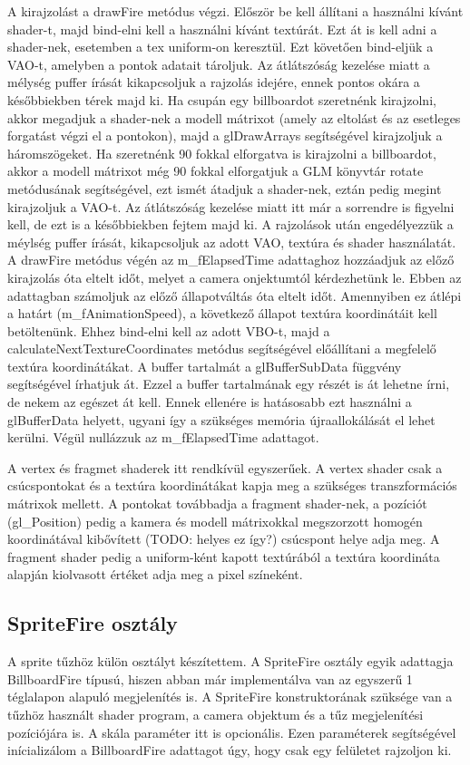 A kirajzolást a drawFire metódus végzi. Először be kell állítani a használni kívánt shader-t, majd bind-elni kell a használni kívánt textúrát. Ezt át is kell adni a shader-nek, esetemben a tex uniform-on keresztül. Ezt követően bind-eljük a VAO-t, amelyben a pontok adatait tároljuk. Az átlátszóság kezelése miatt a mélység puffer írását kikapcsoljuk a rajzolás idejére, ennek pontos okára a későbbiekben térek majd ki. Ha csupán egy billboardot szeretnénk kirajzolni, akkor megadjuk a shader-nek a modell mátrixot (amely az eltolást és az esetleges forgatást végzi el a pontokon), majd a glDrawArrays segítségével kirajzoljuk a háromszögeket. Ha szeretnénk 90 fokkal elforgatva is kirajzolni a billboardot, akkor a modell mátrixot még 90 fokkal elforgatjuk a GLM könyvtár rotate metódusának segítségével, ezt ismét átadjuk a shader-nek, eztán pedig megint kirajzoljuk a VAO-t. Az átlátszóság kezelése miatt itt már a sorrendre is figyelni kell, de ezt is a későbbiekben fejtem majd ki. A rajzolások után engedélyezzük a méylség puffer írását, kikapcsoljuk az adott VAO, textúra és shader használatát. A drawFire metódus végén az m\_fElapsedTime adattaghoz hozzáadjuk az előző kirajzolás óta eltelt időt, melyet a camera onjektumtól kérdezhetünk le. Ebben az adattagban számoljuk az előző állapotváltás óta eltelt időt. Amennyiben ez átlépi a határt (m\_fAnimationSpeed), a következő állapot textúra koordinátáit kell betöltenünk. Ehhez bind-elni kell az adott VBO-t, majd a calculateNextTextureCoordinates metódus segítségével előállítani a megfelelő textúra koordinátákat. A buffer tartalmát a glBufferSubData függvény segítségével írhatjuk át. Ezzel a buffer tartalmának egy részét is át lehetne írni, de nekem az egészet át kell. Ennek ellenére is hatásosabb ezt használni a glBufferData helyett, ugyani így a szükséges memória újraallokálását el lehet kerülni. Végül nullázzuk az m\_fElapsedTime adattagot.

A vertex és fragmet shaderek itt rendkívül egyszerűek. A vertex shader csak a csúcspontokat és a textúra koordinátákat kapja meg a szükséges transzformációs mátrixok mellett. A pontokat továbbadja a fragment shader-nek, a pozíciót (gl\_Position) pedig a kamera és modell mátrixokkal megszorzott homogén koordinátával kibővített (TODO: helyes ez így?) csúcspont helye adja meg. A fragment shader pedig a uniform-ként kapott textúrából a textúra koordináta alapján kiolvasott értéket adja meg a pixel színeként. 

\subsection{SpriteFire osztály}
A sprite tűzhöz külön osztályt készítettem. A SpriteFire osztály egyik adattagja BillboardFire típusú, hiszen abban már implementálva van az egyszerű 1 téglalapon alapuló megjelenítés is. A SpriteFire konstruktorának szüksége van a tűzhöz használt shader program, a camera objektum és a tűz megjelenítési pozíciójára is. A skála paraméter itt is opcionális. Ezen paraméterek segítségével inícializálom a BillboardFire adattagot úgy, hogy csak egy felületet rajzoljon ki. 

